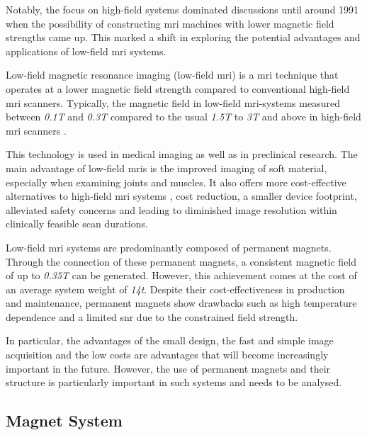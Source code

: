 Notably, the focus on high-field systems dominated discussions until
around 1991 when the possibility of constructing \gls{mri} machines with
lower magnetic field strengths came up. This marked a shift in exploring
the potential advantages and applications of low-field \gls{mri}
systems. \cite{Nitz2016}

Low-field magnetic resonance imaging (low-field \gls{mri}) is a
\gls{mri} technique that operates at a lower magnetic field strength
compared to conventional high-field \gls{mri} scanners. Typically, the
magnetic field in low-field \gls{mri}-systems measured between
\emph{0.1T} and \emph{0.3T} compared to the usual \emph{1.5T} to
\emph{3T} and above in high-field \gls{mri} scanners
\cite{Hori2021-pt}.

This technology is used in medical imaging as well as in preclinical
research. The main advantage of low-field \gls{mri}s is the improved
imaging of soft material, especially when examining joints and muscles.
It also offers more cost-effective alternatives to high-field \gls{mri}
systems \cite{Hori2021-pt}, cost reduction, a smaller device
footprint, alleviated safety concerns and leading to diminished image
resolution within clinically feasible scan durations.
\cite{Arnold2023-cn}

Low-field \gls{mri} systems are predominantly composed of permanent
magnets. Through the connection of these permanent magnets, a consistent
magnetic field of up to \emph{0.35T} can be generated. However, this
achievement comes at the cost of an average system weight of \emph{14t}.
Despite their cost-effectiveness in production and maintenance,
permanent magnets show drawbacks such as high temperature dependence and
a limited \gls{snr} due to the constrained field strength.
\cite{Nitz2016}

In particular, the advantages of the small design, the fast and simple
image acquisition and the low costs are advantages that will become
increasingly important in the future. However, the use of permanent
magnets and their structure is particularly important in such systems
and needs to be analysed.

\hypertarget{magnet-system}{%
\subsection{Magnet System}\label{magnet-system}}

